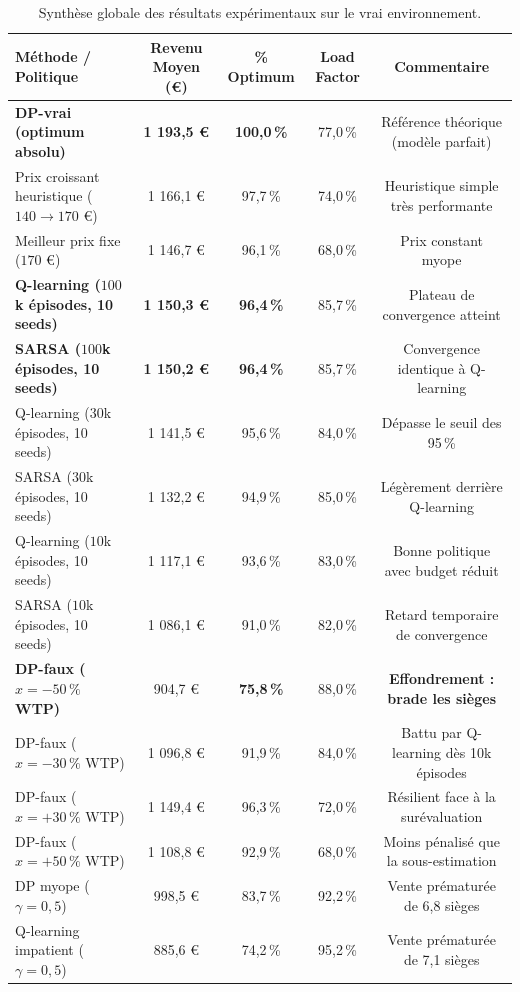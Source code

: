 \documentclass[11pt,a4paper]{article}
\begin{document}
\begin{table}[h!]
\centering
\small
\begin{tabular}{lcccc}
\toprule
\textbf{Méthode / Politique} & \textbf{Revenu Moyen (€)} & \textbf{\% Optimum} & \textbf{Load Factor} & \textbf{Commentaire} \\
\midrule
\textbf{DP-vrai (optimum absolu)} & \textbf{1 193,5 €} & \textbf{100,0\,\%} & 77,0\,\% & Référence théorique (modèle parfait) \\
Prix croissant heuristique ($140 \to 170$ €) & 1 166,1 € & 97,7\,\% & 74,0\,\% & Heuristique simple très performante \\
Meilleur prix fixe ($170$ €) & 1 146,7 € & 96,1\,\% & 68,0\,\% & Prix constant myope \\
\midrule
\textbf{Q-learning ($100$k épisodes, 10 seeds)} & \textbf{1 150,3 €} & \textbf{96,4\,\%} & 85,7\,\% & Plateau de convergence atteint \\
\textbf{SARSA ($100$k épisodes, 10 seeds)} & \textbf{1 150,2 €} & \textbf{96,4\,\%} & 85,7\,\% & Convergence identique à Q-learning \\
Q-learning ($30$k épisodes, 10 seeds) & 1 141,5 € & 95,6\,\% & 84,0\,\% & Dépasse le seuil des 95\,\% \\
SARSA ($30$k épisodes, 10 seeds) & 1 132,2 € & 94,9\,\% & 85,0\,\% & Légèrement derrière Q-learning \\
Q-learning ($10$k épisodes, 10 seeds) & 1 117,1 € & 93,6\,\% & 83,0\,\% & Bonne politique avec budget réduit \\
SARSA ($10$k épisodes, 10 seeds) & 1 086,1 € & 91,0\,\% & 82,0\,\% & Retard temporaire de convergence \\
\midrule
\textbf{DP-faux ($x = -50\,\%$ WTP)} & 904,7 € & \textbf{75,8\,\%} & 88,0\,\% & \textcolor{warnred}{\textbf{Effondrement : brade les sièges}} \\
DP-faux ($x = -30\,\%$ WTP) & 1 096,8 € & 91,9\,\% & 84,0\,\% & Battu par Q-learning dès 10k épisodes \\
DP-faux ($x = +30\,\%$ WTP) & 1 149,4 € & 96,3\,\% & 72,0\,\% & Résilient face à la surévaluation \\
DP-faux ($x = +50\,\%$ WTP) & 1 108,8 € & 92,9\,\% & 68,0\,\% & Moins pénalisé que la sous-estimation \\
\midrule
DP myope ($\gamma = 0{,}5$) & 998,5 € & 83,7\,\% & 92,2\,\% & Vente prématurée de 6,8 sièges \\
Q-learning impatient ($\gamma = 0{,}5$) & 885,6 € & 74,2\,\% & 95,2\,\% & Vente prématurée de 7,1 sièges \\
\bottomrule
\end{tabular}
\caption{Synthèse globale des résultats expérimentaux sur le vrai environnement.}
\label{tab:synthese_results}
\end{table}
\end{document}

